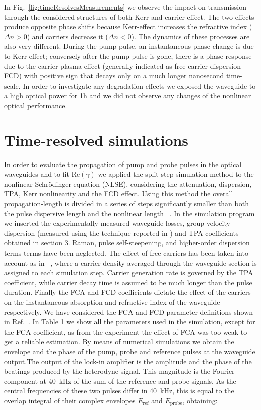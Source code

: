 \documentclass[10pt,letterpaper]{article}
\begin{document}
In Fig.~\ref{fig:timeResolvesMeasurements} we observe the impact on transmission through the considered structures of both Kerr and carrier effect. The two effects produce opposite phase shifts because Kerr-effect increases the refractive index ($\Delta n > 0 $) and carriers decrease it ($ \Delta n < 0 $).  The dynamics  of these processes are also very different. During the pump pulse, an instantaneous phase change is due to Kerr effect; conversely after the pump pulse is gone, there is a phase response due to the carrier plasma effect (generally indicated as free-carrier dispersion - FCD) with positive sign that decays only on a much longer nanosecond time-scale. In order to investigate any degradation effects we exposed the waveguide to a high optical power for 1h and we did not observe any changes of the nonlinear optical performance.


\section{Time-resolved simulations}
In order to evaluate the propagation of pump and probe pulses in the optical waveguides and to fit Re$(\gamma)$ we applied the split-step simulation method to the nonlinear Schr\"{o}dinger equation (NLSE), considering the attenuation, dispersion, TPA, Kerr nonlinearity and the FCD effect. Using this method the overall propagation-length is divided in a series of steps significantly smaller than both the pulse dispersive length and the nonlinear length ~\cite{Agrawal2001a,Lin2007}. In the simulation program we inserted the experimentally measured waveguide losses, group velocity dispersion (measured using the technique reported in \cite{Mas2012}) and TPA coefficients obtained in section 3. Raman, pulse self-steepening, and higher-order dispersion terms terms have been neglected. The effect of free carriers has been taken into account as in ~\cite{Lin2007}, where a carrier density averaged through the waveguide section is assigned to each simulation step. Carrier generation rate is governed by the TPA 
coefficient, while carrier decay time is assumed to be much longer than the pulse duration. Finally the FCA and FCD coefficients dictate the effect of the carriers on the instantaneous absorption and refractive index of the waveguide respectively. We have considered the FCA and FCD parameter definitions shown in Ref.~\cite{Lin2007}. In Table 1 we show all the parameters used in the simulation, except for the FCA coefficient, as from the experiment the effect of FCA was too weak to get a reliable estimation. By means of numerical simulations we obtain the envelope and the phase of the pump, probe and reference pulses at the waveguide output.The output of the lock-in amplifier is the amplitude and the phase of the beatings produced by the heterodyne signal. This magnitude is the Fourier component at 40~kHz of the sum of the reference and probe signals. As the central frequencies of these two pulses differ in 40~kHz, this is equal to the overlap integral of their complex envelopes $E_{\mathrm{ref}}$ and $E_{\mathrm{probe}}$, obtaining:
\end{document}
